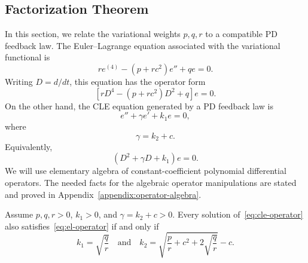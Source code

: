 ﻿\documentclass[12pt]{article}
\begin{document}
\subsection{Factorization Theorem}
In this section, we relate the variational weights $p, q, r$ to a compatible PD feedback law. 
The Euler--Lagrange equation associated with the variational functional is
\[
 re^{(4)} - (p + rc^2)e'' + qe = 0.
\]
Writing $D = d/dt$, this equation has the operator form
\begin{equation}\label{eq:el-operator}
 \left[rD^4 - (p + rc^2)D^2 + q\right]e = 0.
\end{equation}
On the other hand, the CLE equation generated by a PD feedback law is
\[
 e'' + \gamma e' + k_1e = 0,
\]
where
\[
 \gamma = k_2 + c.
\]
Equivalently,
\begin{equation}\label{eq:cle-operator}
 (D^2 + \gamma D + k_1)e = 0.
\end{equation}
We will use elementary algebra of constant-coefficient polynomial differential operators.
The needed facts for the algebraic operator manipulations are stated and proved in Appendix~\ref{appendix:operator-algebra}.

\begin{theorem}\label{factor}
Assume $p, q, r > 0$, $k_1 > 0$, and $\gamma = k_2 + c > 0$.
Every solution of~\eqref{eq:cle-operator} also satisfies~\eqref{eq:el-operator} if and only if
\[
 k_1 = \sqrt{\frac{q}{r}} \quad \text{and}\quad k_2 = \sqrt{ \frac{p}{r} + c^2 + 2\sqrt{\frac{q}{r}} } - c.
\]
\end{theorem}
\end{document}
